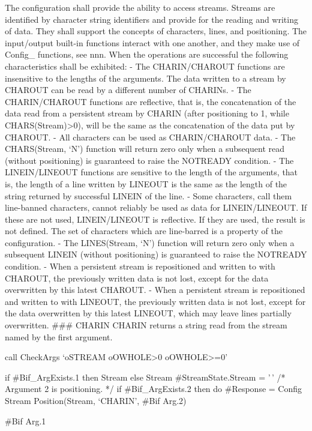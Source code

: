 The configuration shall provide the ability to access streams. Streams
are identified by character string identifiers and provide for the
reading and writing of data. They shall support the concepts of
characters, lines, and positioning. The input/output built-in functions
interact with one another, and they make use of Config\_ functions, see
nnn. When the operations are successful the following characteristics
shall be exhibited: - The CHARIN/CHAROUT functions are insensitive to
the lengths of the arguments. The data written to a stream by CHAROUT
can be read by a different number of CHARINs. - The CHARIN/CHAROUT
functions are reflective, that is, the concatenation of the data read
from a persistent stream by CHARIN (after positioning to 1, while
CHARS(Stream)\textgreater0), will be the same as the concatenation of
the data put by CHAROUT. - All characters can be used as CHARIN/CHAROUT
data. - The CHARS(Stream, `N') function will return zero only when a
subsequent read (without positioning) is guaranteed to raise the
NOTREADY condition. - The LINEIN/LINEOUT functions are sensitive to the
length of the arguments, that is, the length of a line written by
LINEOUT is the same as the length of the string returned by successful
LINEIN of the line. - Some characters, call them line-banned characters,
cannot reliably be used as data for LINEIN/LINEOUT. If these are not
used, LINEIN/LINEOUT is reflective. If they are used, the result is not
defined. The set of characters which are line-barred is a property of
the configuration. - The LINES(Stream, `N') function will return zero
only when a subsequent LINEIN (without positioning) is guaranteed to
raise the NOTREADY condition. - When a persistent stream is repositioned
and written to with CHAROUT, the previously written data is not lost,
except for the data overwritten by this latest CHAROUT. - When a
persistent stream is repositioned and written to with LINEOUT, the
previously written data is not lost, except for the data overwritten by
this latest LINEOUT, which may leave lines partially overwritten. \#\#\#
CHARIN CHARIN returns a string read from the stream named by the first
argument.

call CheckArgs `oSTREAM oOWHOLE\textgreater0 oOWHOLE\textgreater=0'

if \#Bif\_ArgExists.1 then Stream else Stream \#StreamState.Stream =
'\,' /* Argument 2 is positioning. */ if \#Bif\_ArgExists.2 then do
\#Response = Config Stream Position(Stream, `CHARIN', \#Bif Arg.2)

\#Bif Arg.1

